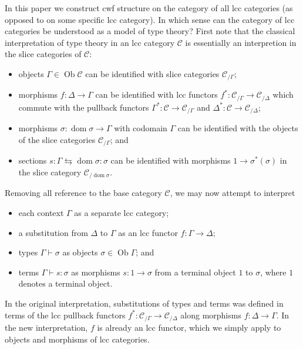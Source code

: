 \documentclass[a4paper]{article}
\theoremstyle{remark}
\theoremstyle{definition}
\begin{document}
In this paper we construct cwf structure on the category of all lcc categories (as opposed to on some specific lcc category).
In which sense can the category of lcc categories be understood as a model of type theory?
First note that the classical interpretation of type theory in an lcc category $\mathcal{C}$ is essentially an interpretion in the slice categories of $\mathcal{C}$:
\begin{itemize}
  \item
    objects $\Gamma \in \operatorname{Ob} \mathcal{C}$ can be identified with slice categories $\mathcal{C}_{/ \Gamma}$;
  \item
    morphisms $f : \Delta \rightarrow \Gamma$ can be identified with lcc functors $f^* : \mathcal{C}_{/ \Gamma} \rightarrow \mathcal{C}_{/ \Delta}$ which commute with the pullback functors $\Gamma^* : \mathcal{C} \rightarrow \mathcal{C}_{/ \Gamma}$ and $\Delta^* : \mathcal{C} \rightarrow \mathcal{C}_{/ \Delta}$;
  \item
    morphisms $\sigma : \operatorname{dom} \sigma \rightarrow \Gamma$ with codomain $\Gamma$ can be identified with the objects of the slice categories $\mathcal{C}_{/ \Gamma}$; and
  \item
    sections $s : \Gamma \leftrightarrows \operatorname{dom} \sigma : \sigma$ can be identified with morphisms $1 \rightarrow \sigma^*(\sigma)$ in the slice category $\mathcal{C}_{/ \operatorname{dom} \sigma}$.
\end{itemize}
Removing all reference to the base category $\mathcal{C}$, we may now attempt to interpret
\begin{itemize}
  \item
    each context $\Gamma$ as a separate lcc category;
  \item
    a substitution from $\Delta$ to $\Gamma$ as an lcc functor $f : \Gamma \rightarrow \Delta$;
  \item
    types $\Gamma \vdash \sigma$ as objects $\sigma \in \operatorname{Ob} \Gamma$; and
  \item
    terms $\Gamma \vdash s : \sigma$ as morphisms $s : 1 \rightarrow \sigma$ from a terminal object $1$ to $\sigma$, where $1$ denotes a terminal object.
\end{itemize}
In the original interpretation, substitutions of types and terms was defined in terms of the lcc pullback functors $f^* : \mathcal{C}_{/ \Gamma} \rightarrow \mathcal{C}_{/ \Delta}$ along morphisms $f : \Delta \rightarrow \Gamma$.
In the new interpretation, $f$ is already an lcc functor, which we simply apply to objects and morphisms of lcc categories.
\end{document}
